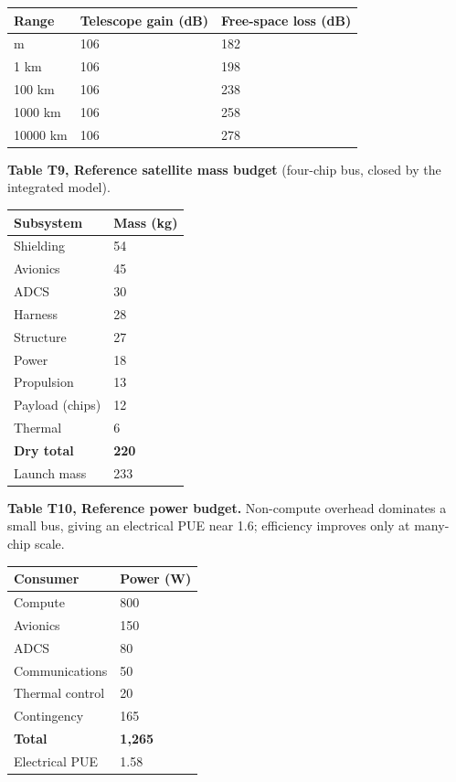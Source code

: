 \documentclass[
  11pt,
  openany,
  oneside]{book}
\newcounter{none} %
\begin{document}
{\def\LTcaptype{none} %
\begin{longtable}[]{@{}lll@{}}
\toprule\noalign{}
Range & Telescope gain (dB) & Free-space loss (dB) \\
\midrule\noalign{}
\endhead
\bottomrule\noalign{}
\endlastfoot
150 m & 106 & 182 \\
1 km & 106 & 198 \\
100 km & 106 & 238 \\
1000 km & 106 & 258 \\
10000 km & 106 & 278 \\
\end{longtable}
}

\textbf{Table T9, Reference satellite mass budget} (four-chip bus,
closed by the integrated model).

{\def\LTcaptype{none} %
\begin{longtable}[]{@{}ll@{}}
\toprule\noalign{}
Subsystem & Mass (kg) \\
\midrule\noalign{}
\endhead
\bottomrule\noalign{}
\endlastfoot
Shielding & 54 \\
Avionics & 45 \\
ADCS & 30 \\
Harness & 28 \\
Structure & 27 \\
Power & 18 \\
Propulsion & 13 \\
Payload (chips) & 12 \\
Thermal & 6 \\
\textbf{Dry total} & \textbf{220} \\
Launch mass & 233 \\
\end{longtable}
}

\textbf{Table T10, Reference power budget.} Non-compute overhead
dominates a small bus, giving an electrical PUE near 1.6; efficiency
improves only at many-chip scale.

{\def\LTcaptype{none} %
\begin{longtable}[]{@{}ll@{}}
\toprule\noalign{}
Consumer & Power (W) \\
\midrule\noalign{}
\endhead
\bottomrule\noalign{}
\endlastfoot
Compute & 800 \\
Avionics & 150 \\
ADCS & 80 \\
Communications & 50 \\
Thermal control & 20 \\
Contingency & 165 \\
\textbf{Total} & \textbf{1,265} \\
Electrical PUE & 1.58 \\
\end{longtable}
}
\end{document}
